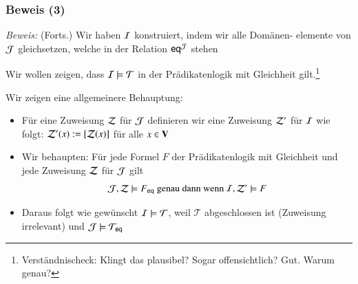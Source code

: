 \documentclass[onlymath]{beamer}
\begin{document}
\begin{frame}[t]\frametitle{Beweis (3)}

% 

\emph{Beweis:} {\footnotesize(Forts.)}
Wir haben $\mathcal{I}$ konstruiert, indem wir alle Domänen- elemente von $\mathcal{J}$
gleichsetzen, welche in der Relation $\textsf{eq}^{\mathcal{J}}$ stehen
\medskip

Wir wollen zeigen, dass $\mathcal{I}\models\mathcal{T}$ in der Prädikatenlogik mit Gleichheit gilt.\footnote{\tiny Verständnischeck: Klingt das plausibel? Sogar offensichtlich? Gut. Warum genau?}\pause\medskip

\alert{Wir zeigen eine allgemeinere Behauptung:}
\begin{itemize}
\item Für eine Zuweisung $\mathcal{Z}$ für $\mathcal{J}$ definieren wir eine Zuweisung $\mathcal{Z}'$ für $\mathcal{I}$ wie folgt: $\mathcal{Z}'(x)\mathrel{:=}[\mathcal{Z}(x)]$ für alle $x\in\textbf{\textcolor{black}{V}}$
\item Wir behaupten: Für jede Formel $F$ der Prädikatenlogik mit Gleichheit und jede Zuweisung $\mathcal{Z}$ für $\mathcal{J}$ gilt
\[ \mathcal{J},\mathcal{Z}\models F_{\textsf{eq}} \text{ genau dann wenn } \mathcal{I},\mathcal{Z}'\models F \]
\item Daraus folgt wie gewünscht $\mathcal{I}\models\mathcal{T}$, weil $\mathcal{T}$ abgeschlossen ist (Zuweisung irrelevant) und $\mathcal{J}\models\mathcal{T}_{\textsf{eq}}$
% 
\end{itemize}


\end{frame}
\end{document}
